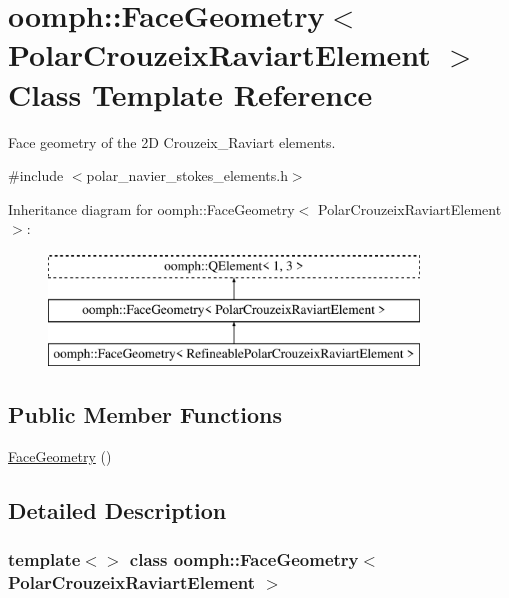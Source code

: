 \hypertarget{classoomph_1_1FaceGeometry_3_01PolarCrouzeixRaviartElement_01_4}{}\section{oomph\+:\+:Face\+Geometry$<$ Polar\+Crouzeix\+Raviart\+Element $>$ Class Template Reference}
\label{classoomph_1_1FaceGeometry_3_01PolarCrouzeixRaviartElement_01_4}


Face geometry of the 2D Crouzeix\+\_\+\+Raviart elements.  




{\ttfamily \#include $<$polar\+\_\+navier\+\_\+stokes\+\_\+elements.\+h$>$}

Inheritance diagram for oomph\+:\+:Face\+Geometry$<$ Polar\+Crouzeix\+Raviart\+Element $>$\+:\begin{figure}[H]
\begin{center}
\leavevmode
\includegraphics[height=3.000000cm]{classoomph_1_1FaceGeometry_3_01PolarCrouzeixRaviartElement_01_4}
\end{center}
\end{figure}
\subsection*{Public Member Functions}
\begin{DoxyCompactItemize}
\item 
\hyperlink{classoomph_1_1FaceGeometry_3_01PolarCrouzeixRaviartElement_01_4_a312ae3b4c0a6d7007dd09a424b44196b}{Face\+Geometry} ()
\end{DoxyCompactItemize}


\subsection{Detailed Description}
\subsubsection*{template$<$$>$\newline
class oomph\+::\+Face\+Geometry$<$ Polar\+Crouzeix\+Raviart\+Element $>$}

